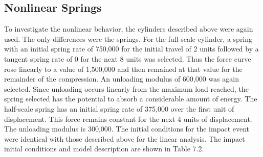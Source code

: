 \subsection{Nonlinear Springs}

     To investigate the nonlinear behavior, the cylinders described
above were again used.  The only differences were the springs.  For
the full-scale cylinder, 
a spring with an initial spring rate of 750,000 for
the initial travel of 2 units 
followed by a tangent spring rate of 0 for the
next 8 units 
was selected.  Thus the force curve rose linearly to a value of
1,500,000 
and then remained at that value for the remainder of the
compression.  An unloading modulus of 600,000 was again selected. 
Since unloading occurs linearly from the maximum load reached, the
spring selected has the potential to absorb a considerable amount of
energy.  The half-scale spring has an initial spring rate of 375,000
over the first unit 
of displacement. This force remains constant for the
next 4 units of displacement.  The unloading modulus is 300,000.  The
initial conditions for the impact event were identical with those
described above for the linear analysis.  The impact initial
conditions and model description are shown in Table 7.2. 

